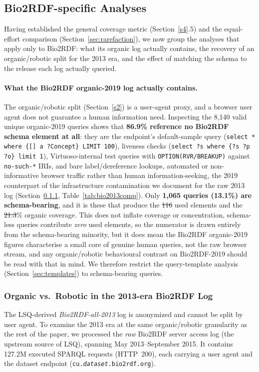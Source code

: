 \documentclass[sw]{iosart2x}
\providecommand{\DIFadd}[1]{{\protect\color{blue}\uwave{#1}}} %
\providecommand{\DIFdel}[1]{{\protect\color{red}\sout{#1}}} %
\providecommand{\DIFaddbegin}{} %
\providecommand{\DIFaddend}{} %
\providecommand{\DIFdelbegin}{} %
\providecommand{\DIFdelend}{} %
\providecommand{\DIFscaledelfig}{0.5}
\newlength{\DIFdelgraphicswidth} %
\newlength{\DIFdelgraphicsheight} %
\providecommand{\DIFaddincludegraphics}[2][]{{\color{blue}\fbox{\DIFOincludegraphics[#1]{#2}}}} %
\providecommand{\DIFdelincludegraphics}[2][]{%
\sbox{\DIFdelgraphicsbox}{\DIFOincludegraphics[#1]{#2}}%
\settoboxwidth{\DIFdelgraphicswidth}{\DIFdelgraphicsbox} %
\settoboxtotalheight{\DIFdelgraphicsheight}{\DIFdelgraphicsbox} %
\scalebox{\DIFscaledelfig}{%
\parbox[b]{\DIFdelgraphicswidth}{\usebox{\DIFdelgraphicsbox}\\[-\baselineskip] \rule{\DIFdelgraphicswidth}{0em}}\llap{\resizebox{\DIFdelgraphicswidth}{\DIFdelgraphicsheight}{%
\setlength{\unitlength}{\DIFdelgraphicswidth}%
\begin{picture}(1,1)%
\thicklines\linethickness{2pt} %
{\color[rgb]{1,0,0}\put(0,0){\framebox(1,1){}}}%
{\color[rgb]{1,0,0}\put(0,0){\line( 1,1){1}}}%
{\color[rgb]{1,0,0}\put(0,1){\line(1,-1){1}}}%
\end{picture}%
}\hspace*{3pt}}} %
} %
\DeclareRobustCommand{\DIFaddbegin}{\DIFOaddbegin \let\includegraphics\DIFaddincludegraphics} %
\DeclareRobustCommand{\DIFaddend}{\DIFOaddend \let\includegraphics\DIFOincludegraphics} %
\DeclareRobustCommand{\DIFdelbegin}{\DIFOdelbegin \let\includegraphics\DIFdelincludegraphics} %
\DeclareRobustCommand{\DIFdelend}{\DIFOaddend \let\includegraphics\DIFOincludegraphics} %
\begin{document}
\subsection{Bio2RDF-specific Analyses}\label{sec:bio2rdfresults}
Having established the general coverage metric (Section~\ref{s4}.5) and the equal-effort comparison (Section~\ref{sec:rarefaction}), we now group the analyses that apply only to Bio2RDF: what its organic log actually contains, the recovery of an organic/robotic split for the 2013 era, and the effect of matching the schema to the release each log actually queried.

\paragraph{\textbf{What the Bio2RDF organic-2019 log actually contains.}} The organic/robotic split (Section~\ref{s2}) is a user-agent proxy, and a browser user agent does not guarantee a human information need. Inspecting the 8{,}140 valid unique organic-2019 queries shows that \textbf{86.9\% reference no Bio2RDF schema element at all}: they are the endpoint's default-sample query (\texttt{select * where \{[] a ?Concept\} LIMIT 100}), liveness checks (\texttt{select ?s where \{?s ?p ?o\} limit 1}), Virtuoso-internal test queries with \texttt{OPTION(RVR/BREAKUP)} against \texttt{no-such-*} IRIs, and bare label/dereference lookups, automated or non-informative browser traffic rather than human information-seeking, the 2019 counterpart of the infrastructure contamination we document for the raw 2013 log (Section~\ref{sec:bio2013}, Table~\ref{tab:bio2013comp}). Only \textbf{1{,}065 queries (13.1\%) are schema-bearing}, and it is these that produce the \DIFdelbegin \DIFdel{116 }\DIFdelend \DIFaddbegin \DIFadd{113 }\DIFaddend used elements and the \DIFdelbegin \DIFdel{21.3}\DIFdelend \DIFaddbegin \DIFadd{20.9}\DIFaddend \% organic coverage. This does not inflate coverage or concentration, schema-less queries contribute \emph{zero} used elements, so the numerator is drawn entirely from the schema-bearing minority, but it does mean the Bio2RDF organic-2019 figures characterise a small core of genuine human queries, not the raw browser stream, and any organic/robotic behavioural contrast on Bio2RDF-2019 should be read with that in mind. We therefore restrict the query-template analysis (Section~\ref{sec:templates}) to schema-bearing queries.

\subsubsection{Organic vs.\ Robotic in the 2013-era Bio2RDF Log}\label{sec:bio2013}
The LSQ-derived \emph{Bio2RDF-all-2013} log is anonymized and cannot be split by user agent. To examine the 2013 era at the same organic/robotic granularity as the rest of the paper, we processed the \emph{raw} Bio2RDF server access log (the upstream source of LSQ), spanning May 2013--September 2015. It contains 127.2M executed SPARQL requests (HTTP~200), each carrying a user agent and the dataset endpoint (\texttt{cu.\textit{dataset}.bio2rdf.org}).
\end{document}
